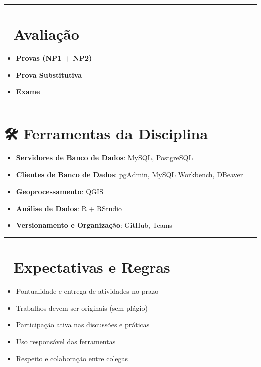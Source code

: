 \documentclass[
]{book}
\providecommand{\tightlist}{%
  \setlength{\itemsep}{0pt}\setlength{\parskip}{0pt}}
\begin{document}
\begin{center}\rule{0.5\linewidth}{0.5pt}\end{center}

\chapter{📝 Avaliação}\label{avaliauxe7uxe3o}

\begin{itemize}
\tightlist
\item
  \textbf{Provas (NP1 + NP2)}
\item
  \textbf{Prova Substitutiva}
\item
  \textbf{Exame}
\end{itemize}

\begin{center}\rule{0.5\linewidth}{0.5pt}\end{center}

\chapter{🛠️ Ferramentas da Disciplina}\label{ferramentas-da-disciplina}

\begin{itemize}
\tightlist
\item
  \textbf{Servidores de Banco de Dados}: MySQL, PostgreSQL
\item
  \textbf{Clientes de Banco de Dados}: pgAdmin, MySQL Workbench, DBeaver\\
\item
  \textbf{Geoprocessamento}: QGIS\\
\item
  \textbf{Análise de Dados}: R + RStudio\\
\item
  \textbf{Versionamento e Organização}: GitHub, Teams
\end{itemize}

\begin{center}\rule{0.5\linewidth}{0.5pt}\end{center}

\chapter{📌 Expectativas e Regras}\label{expectativas-e-regras}

\begin{itemize}
\tightlist
\item
  Pontualidade e entrega de atividades no prazo
\item
  Trabalhos devem ser originais (sem plágio)
\item
  Participação ativa nas discussões e práticas
\item
  Uso responsável das ferramentas
\item
  Respeito e colaboração entre colegas
\end{itemize}
\end{document}
